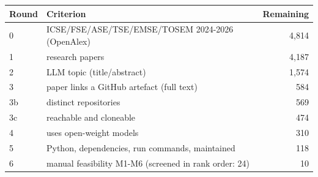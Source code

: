 \begin{tabular}{@{}l l r@{}}
\toprule
Round & Criterion & Remaining \\
\midrule
0 & ICSE/FSE/ASE/TSE/EMSE/TOSEM 2024-2026 (OpenAlex) & 4{,}814 \\
1 & research papers & 4{,}187 \\
2 & LLM topic (title/abstract) & 1{,}574 \\
3 & paper links a GitHub artefact (full text) & 584 \\
3b & distinct repositories & 569 \\
3c & reachable and cloneable & 474 \\
4 & uses open-weight models & 310 \\
5 & Python, dependencies, run commands, maintained & 118 \\
6 & manual feasibility M1-M6 (screened in rank order: 24) & 10 \\
\bottomrule
\end{tabular}
